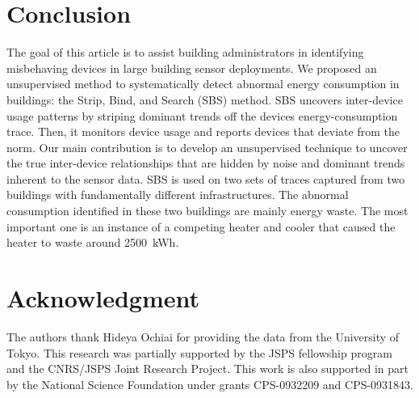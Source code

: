 \section{Conclusion}
The goal of this article is to assist building administrators in identifying misbehaving devices in large building sensor
deployments.  
We proposed an unsupervised method to systematically detect abnormal energy consumption in buildings: the Strip, Bind, and Search (SBS) method.
SBS uncovers inter-device usage patterns by striping dominant trends off the devices energy-consumption trace.
Then, it monitors device usage and reports devices that deviate from the norm.  
Our main contribution is to develop an unsupervised technique to uncover the true inter-device relationships that are hidden by noise and 
dominant trends inherent to the sensor data.  
SBS is used on two sets of traces captured from two buildings with fundamentally different infrastructures.
The abnormal consumption identified in these two buildings are mainly energy waste.
The most important one is an instance of a competing heater and cooler that caused the heater to waste around 2500~kWh.



\section*{Acknowledgment}
The authors thank Hideya Ochiai for providing the data from the University of Tokyo.
This research was partially supported by the JSPS fellowship program and the CNRS/JSPS Joint Research Project.
This work is also supported in part by the National Science Foundation under grants CPS-0932209 and CPS-0931843.
